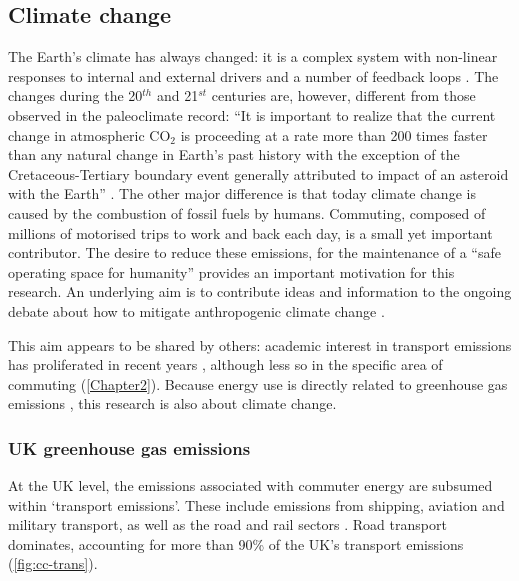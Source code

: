 \subsection{Climate change}
The Earth's climate has always changed: it is a complex system with non-linear
responses to internal and external drivers and a number of feedback loops
\citep{IPCC2007}. The changes during the 20$^{th}$ and 21$^{st}$ centuries are,
however, different from those observed in the paleoclimate record: ``It is
important to realize that the
current change in atmospheric CO$_{2}$ is proceeding at a rate more than 200
times faster than any natural change in Earth's past history with the exception
of the Cretaceous-Tertiary boundary event generally attributed to impact of an
asteroid with the Earth'' \citep{Hay2011}. The other major difference is that
today climate change is caused by the combustion of fossil fuels by humans.
Commuting, composed of millions of motorised trips to work and back each day, is
a small yet important contributor. The desire to reduce these emissions, for the
maintenance of a ``safe operating space for humanity'' \citep{Rockstrom2009}
provides an important motivation for this research. An underlying aim is to
contribute ideas and information to the ongoing debate about how to mitigate
anthropogenic climate change \citep{Matschoss2011}.


This aim appears to be shared by others:
academic interest in transport emissions has proliferated in recent years
\citep{Akerman2006, Chapman2007, Schwanen2011}, although less so in the
specific area of commuting (\cref{Chapter2}).
Because energy use is directly related to greenhouse gas
emissions \citep{MacKay2009}, this research is also about climate change.

\subsubsection*{UK greenhouse gas emissions}
At the UK level, the emissions associated with commuter energy are subsumed
within `transport emissions'. These include emissions from shipping, aviation
and military transport, as well as the road and rail sectors
\citep{Decc2011t}. Road transport dominates,
accounting for more than 90\% of the UK's transport emissions
(\cref{fig:cc-trans}).

